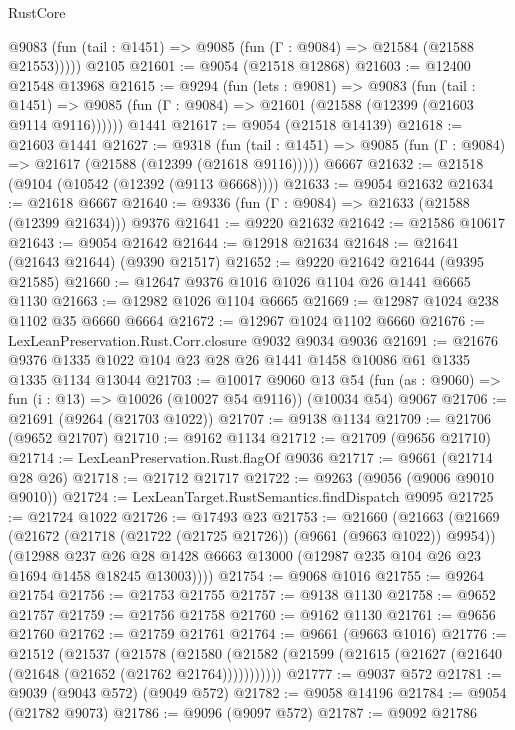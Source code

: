 \begin{lexlean}{RustCore}
\begin{coremodule}
      @9083 (fun (tail : @1451) => @9085 (fun (Γ : @9084) => @21584 (@21588 @21553)))))
    @2105
@21601 := @9054 (@21518 @12868)
@21603 := @12400 @21548 @13968
@21615 := @9294
    (fun (lets : @9081) =>
    @9083
      (fun (tail : @1451) =>
      @9085 (fun (Γ : @9084) => @21601 (@21588 (@12399 (@21603 @9114 @9116))))))
    @1441
@21617 := @9054 (@21518 @14139)
@21618 := @21603 @1441
@21627 := @9318
    (fun (tail : @1451) => @9085 (fun (Γ : @9084) => @21617 (@21588 (@12399 (@21618 @9116)))))
    @6667
@21632 := @21518 (@9104 (@10542 (@12392 (@9113 @6668))))
@21633 := @9054 @21632
@21634 := @21618 @6667
@21640 := @9336 (fun (Γ : @9084) => @21633 (@21588 (@12399 @21634))) @9376
@21641 := @9220 @21632
@21642 := @21586 @10617
@21643 := @9054 @21642
@21644 := @12918 @21634
@21648 := @21641 (@21643 @21644) (@9390 @21517)
@21652 := @9220 @21642 @21644 (@9395 @21585)
@21660 := @12647 @9376 @1016 @1026 @1104 @26 @1441 @6665 @1130
@21663 := @12982 @1026 @1104 @6665
@21669 := @12987 @1024 @238 @1102 @35 @6660 @6664
@21672 := @12967 @1024 @1102 @6660
@21676 := LexLeanPreservation.Rust.Corr.closure @9032 @9034 @9036
@21691 := @21676 @9376 @1335 @1022 @104 @23 @28 @26 @1441 @1458 @10086 @61 @1335 @1335 @1134 @13044
@21703 := @10017
    @9060
    @13
    @54
    (fun (as : @9060) => fun (i : @13) => @10026 (@10027 @54 @9116))
    (@10034 @54)
    @9067
@21706 := @21691 (@9264 (@21703 @1022))
@21707 := @9138 @1134
@21709 := @21706 (@9652 @21707)
@21710 := @9162 @1134
@21712 := @21709 (@9656 @21710)
@21714 := LexLeanPreservation.Rust.flagOf @9036
@21717 := @9661 (@21714 @28 @26)
@21718 := @21712 @21717
@21722 := @9263 (@9056 (@9006 @9010 @9010))
@21724 := LexLeanTarget.RustSemantics.findDispatch @9095
@21725 := @21724 @1022
@21726 := @17493 @23
@21753 := @21660
    (@21663
      (@21669
        (@21672 (@21718 (@21722 (@21725 @21726)) (@9661 (@9663 @1022)) @9954))
        (@12988
          @237
          @26
          @28
          @1428
          @6663
          @13000
          (@12987 @235 @104 @26 @23 @1694 @1458 @18245 @13003))))
@21754 := @9068 @1016
@21755 := @9264 @21754
@21756 := @21753 @21755
@21757 := @9138 @1130
@21758 := @9652 @21757
@21759 := @21756 @21758
@21760 := @9162 @1130
@21761 := @9656 @21760
@21762 := @21759 @21761
@21764 := @9661 (@9663 @1016)
@21776 := @21512
    (@21537
      (@21578
        (@21580 (@21582 (@21599 (@21615 (@21627 (@21640 (@21648 (@21652 (@21762 @21764)))))))))))
@21777 := @9037 @572
@21781 := @9039 (@9043 @572) (@9049 @572)
@21782 := @9058 @14196
@21784 := @9054 (@21782 @9073)
@21786 := @9096 (@9097 @572)
@21787 := @9092 @21786

\end{coremodule}
\end{lexlean}

